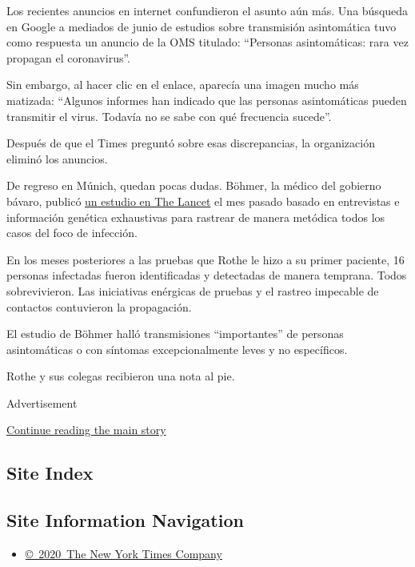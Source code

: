 Los recientes anuncios en internet confundieron el asunto aún más. Una
búsqueda en Google a mediados de junio de estudios sobre transmisión
asintomática tuvo como respuesta un anuncio de la OMS titulado:
``Personas asintomáticas: rara vez propagan el coronavirus''.

Sin embargo, al hacer clic en el enlace, aparecía una imagen mucho más
matizada: ``Algunos informes han indicado que las personas asintomáticas
pueden transmitir el virus. Todavía no se sabe con qué frecuencia
sucede''.

Después de que el Times preguntó sobre esas discrepancias, la
organización eliminó los anuncios.

De regreso en Múnich, quedan pocas dudas. Böhmer, la médico del gobierno
bávaro, publicó
\href{https://www.thelancet.com/journals/laninf/article/PIIS1473-3099(20)30314-5/fulltex}{un
estudio en The Lancet} el mes pasado basado en entrevistas e información
genética exhaustivas para rastrear de manera metódica todos los casos
del foco de infección.

En los meses posteriores a las pruebas que Rothe le hizo a su primer
paciente, 16 personas infectadas fueron identificadas y detectadas de
manera temprana. Todos sobrevivieron. Las iniciativas enérgicas de
pruebas y el rastreo impecable de contactos contuvieron la propagación.

El estudio de Böhmer halló transmisiones ``importantes'' de personas
asintomáticas o con síntomas excepcionalmente leves y no específicos.

Rothe y sus colegas recibieron una nota al pie.

Advertisement

\protect\hyperlink{after-bottom}{Continue reading the main story}

\hypertarget{site-index}{%
\subsection{Site Index}\label{site-index}}

\hypertarget{site-information-navigation}{%
\subsection{Site Information
Navigation}\label{site-information-navigation}}

\begin{itemize}
\tightlist
\item
  \href{https://help.nytimes3xbfgragh.onion/hc/en-us/articles/115014792127-Copyright-notice}{©~2020~The
  New York Times Company}
\end{itemize}

